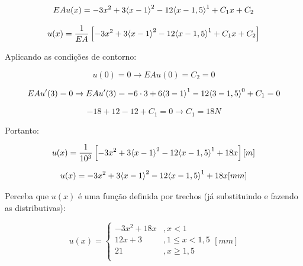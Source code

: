         \begin{equation*}
            EAu(x) = -3x^2 + 3{\left\langle x-1\right\rangle^{2}} - 12{\left\langle x-1,5\right\rangle^{1}} + C_1 x + C_2
        \end{equation*}

        \begin{equation*}
            u(x) = \frac{1}{EA} \left[-3x^2 + 3{\left\langle x-1\right\rangle^{2}} - 12{\left\langle x-1,5\right\rangle^{1}} + C_1 x + C_2\right]
        \end{equation*}

        Aplicando as condições de contorno:

        \begin{equation*}
            u(0) = 0 \rightarrow EAu(0) = C_2 = 0
        \end{equation*}

        \begin{equation*}
            EAu'(3) = 0 \rightarrow EAu'(3) = -6 \cdot 3 + 6{\left\langle 3-1\right\rangle^{1}} - 12{\left\langle 3-1,5\right\rangle^{0}} + C_1 = 0
        \end{equation*}

        \begin{equation*}
           -18 + 12 - 12 + C_1 = 0 \rightarrow C_1 = 18 N
        \end{equation*}


        Portanto:

        \begin{equation*}
            u(x) = \frac{1}{10^3} \left[-3x^2 + 3{\left\langle x-1\right\rangle^{2}} - 12{\left\langle x-1,5\right\rangle^{1}} + 18 x\right] [m]
        \end{equation*}

        \begin{equation*}
            u(x) = -3x^2 + 3{\left\langle x-1\right\rangle^{2}} - 12{\left\langle x-1,5\right\rangle^{1}} + 18 x [mm]
        \end{equation*}

        Perceba que $u(x)$ é uma função definida por trechos (já substituindo e fazendo as distributivas):

        \begin{equation*}
            u(x) = 
            \left\{
            \begin{array}{cl}
                -3x^2 + 18x &, x<1\\
                12x + 3 &, 1\leq x<1,5\\
                21 &, x\geq 1,5\\
            \end{array}
            \right. [mm]
        \end{equation*}


